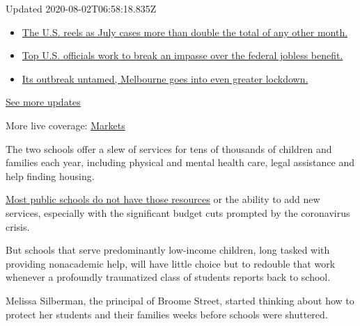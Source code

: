 Updated 2020-08-02T06:58:18.835Z

\begin{itemize}
\tightlist
\item
  \href{https://www.nytimes.com/2020/08/01/world/coronavirus-covid-19.html?action=click\&pgtype=Article\&state=default\&region=MAIN_CONTENT_1\&context=storylines_live_updates\#link-34047410}{The
  U.S. reels as July cases more than double the total of any other
  month.}
\item
  \href{https://www.nytimes.com/2020/08/01/world/coronavirus-covid-19.html?action=click\&pgtype=Article\&state=default\&region=MAIN_CONTENT_1\&context=storylines_live_updates\#link-780ec966}{Top
  U.S. officials work to break an impasse over the federal jobless
  benefit.}
\item
  \href{https://www.nytimes.com/2020/08/01/world/coronavirus-covid-19.html?action=click\&pgtype=Article\&state=default\&region=MAIN_CONTENT_1\&context=storylines_live_updates\#link-2bc8948}{Its
  outbreak untamed, Melbourne goes into even greater lockdown.}
\end{itemize}

\href{https://www.nytimes.com/2020/08/01/world/coronavirus-covid-19.html?action=click\&pgtype=Article\&state=default\&region=MAIN_CONTENT_1\&context=storylines_live_updates}{See
more updates}

More live coverage:
\href{https://www.nytimes.com/live/2020/07/31/business/stock-market-today-coronavirus?action=click\&pgtype=Article\&state=default\&region=MAIN_CONTENT_1\&context=storylines_live_updates}{Markets}

The two schools offer a slew of services for tens of thousands of
children and families each year, including physical and mental health
care, legal assistance and help finding housing.

\href{https://www.nytimes.com/2020/07/14/us/coronavirus-schools-fall.html}{Most
public schools do not have those resources} or the ability to add new
services, especially with the significant budget cuts prompted by the
coronavirus crisis.

But schools that serve predominantly low-income children, long tasked
with providing nonacademic help, will have little choice but to redouble
that work whenever a profoundly traumatized class of students reports
back to school.

Melissa Silberman, the principal of Broome Street, started thinking
about how to protect her students and their families weeks before
schools were shuttered.

